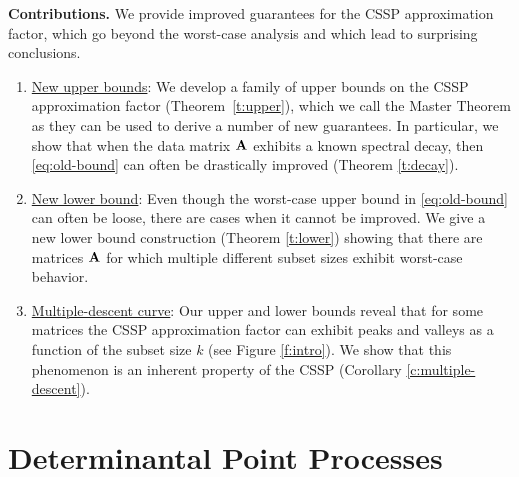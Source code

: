 \documentclass{article}
\begin{document}
\textbf{Contributions.} We provide improved guarantees for the CSSP
approximation factor, which go beyond the worst-case analysis and 
which lead to surprising conclusions.%
\begin{enumerate}
\item\underline{New upper bounds}:
We develop a family of upper bounds on the CSSP approximation factor
(Theorem~\ref{t:upper}), which we call the Master Theorem
as they can be used to derive a number 
of new guarantees. In particular, we show that when the data matrix $\mathbf A$ exhibits a
known spectral decay, then \eqref{eq:old-bound} can often be
drastically improved (Theorem \ref{t:decay}).
\item \underline{New lower bound}:
Even though the worst-case upper bound in \eqref{eq:old-bound} can often
be loose, there are cases when it cannot be improved.
We give a new lower bound construction (Theorem \ref{t:lower}) showing
that there are matrices $\mathbf A$ for which multiple different subset sizes exhibit
worst-case behavior.
\item \underline{Multiple-descent curve}: 
Our upper and lower bounds
reveal that for some matrices the CSSP approximation factor can exhibit
peaks and valleys as a function of the subset size $k$ (see Figure
\ref{f:intro}).  We show that this phenomenon is an inherent property
of the CSSP  (Corollary \ref{c:multiple-descent}).
\end{enumerate}



\section{Determinantal Point Processes}
\label{s:dpp}
\end{document}
